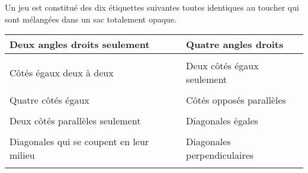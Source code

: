 
\medskip

Un jeu est constitué des dix étiquettes suivantes toutes identiques au toucher qui sont mélangées dans un sac totalement opaque.

\bigskip

{\footnotesize \begin{tabularx}{\linewidth} {|>{\centering \arraybackslash}X|m{0.5cm}|>{\centering \arraybackslash}X|}\cline{1-1}\cline{3-3}
Deux angles droits seulement &&Quatre angles droits\\\cline{1-1}\cline{3-3}
\multicolumn{3}{c}{~}\\\cline{1-1}\cline{3-3}
Côtés égaux deux à deux &&Deux côtés égaux seulement \\\cline{1-1}\cline{3-3}
\multicolumn{3}{c}{~}\\\cline{1-1}\cline{3-3}
Quatre côtés égaux &&Côtés opposés parallèles\\\cline{1-1}\cline{3-3} 
\multicolumn{3}{c}{~}\\\cline{1-1}\cline{3-3}
Deux côtés parallèles seulement &&Diagonales égales\\\cline{1-1}\cline{3-3} 
\multicolumn{3}{c}{~}\\\cline{1-1}\cline{3-3}
Diagonales qui se coupent en leur milieu &&Diagonales perpendiculaires\\\cline{1-1}\cline{3-3}
\end{tabularx}} 

\bigskip

